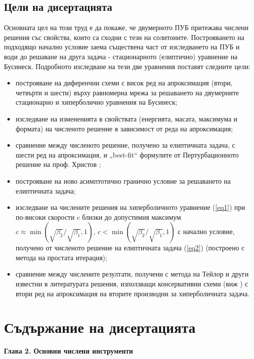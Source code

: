 \documentclass[a5paper]{article}
\newcommand{\rf}[1]{(\ref{#1})}
\theoremstyle{remark}
\begin{document}
\begin{large}
\subsection{Цели на дисертацията}
Основната цел на този труд е да покаже, че двумерното ПУБ притежава числени решения със свойства, които са сходни с тези на солитоните. Построяването на подходящо начално условие заема съществена част от изследването на ПУБ и води до решаване на друга задача - стационарното (елиптично) уравнение на Бусинеск. Подробното изследване на тези две уравнения поставят следните цели:
\begin{itemize}
  \item построяване на диференчни схеми с висок ред на апроксимация (втори, четвърти и шести) върху равномерна мрежа за решаването на двумерните стационарно и хиперболично уравнения на Бусинеск;
  \item изследване на измененията в свойствата (енергията, масата, максимума и формата) на численото решение в зависимост от реда на апроксимация;
  \item сравнение между численото решение, получено за елиптичната задача, с шести ред на апроксимация, и „best-fit“ формулите от Пертурбационното решение на проф. Христов \cite{ref15};
  \item построяване на ново асимптотично гранично условие за решаването на елиптичната задача;
  \item изследване на числените решения на хиперболичното уравнение \rf{eq1} при по-високи скорости $c$ близки до допустимия максимум $c \approx \min (\sqrt{\beta_2}/ \sqrt{\beta_1},1)$, $c < \min (\sqrt{\beta_2}/ \sqrt{\beta_1},1)$ с начално условие, получено от численото решение на елиптичната задача \rf{eq2} (построено с метода на простата итерация);
  \item сравнение между числените резултати, получени с метода на Тейлор и други известни в литературата решения, използващи консервативни схеми (виж \cite{ref20, ref23}) с втори ред на апроксимация на вторите производни за хиперболичната задача.
\end{itemize}

\section{Съдържание на дисертацията}
 
\textbf{Глава 2. Основни числени инструменти}


\end{large}
\end{document}
